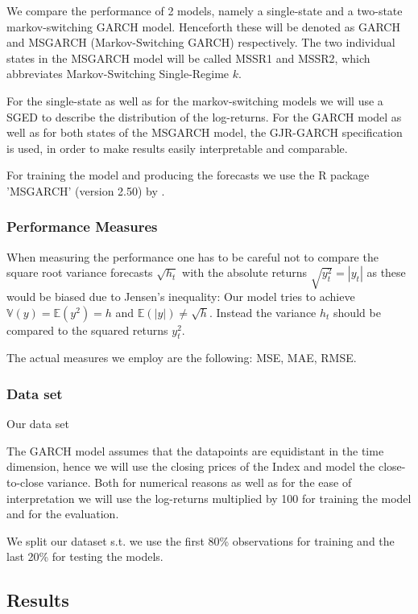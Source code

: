 \documentclass[11pt,a4paper]{article}
\begin{document}
We compare the performance of 2 models, namely a single-state and a two-state markov-switching GARCH model. Henceforth these will be denoted as GARCH and MSGARCH (Markov-Switching GARCH) respectively. The two individual states in the MSGARCH model will be called MSSR1 and MSSR2, which abbreviates Markov-Switching Single-Regime $k$.

For the single-state as well as for the markov-switching models we will use a \ac{SGED} to describe the distribution of the log-returns.
For the GARCH model as well as for both states of the MSGARCH model, the GJR-GARCH specification is used, in order to make results easily interpretable and comparable.

For training the model and producing the forecasts we use the R package 'MSGARCH' (version 2.50) by \cite{ardia_markov-switching_2019}.

\subsubsection{Performance Measures}
When measuring the performance one has to be careful not to compare the square root variance forecasts $\sqrt{h_t}$ with the absolute returns $\sqrt{y_t^2} = | y_t |$ as these would be biased due to Jensen's inequality: Our model tries to achieve $\mathbb{V}(y) =\mathbb{E}(y^2) = h$ and $\mathbb{E}(| y |) \neq \sqrt{h}$. Instead the variance $h_t$ should be compared to the squared returns $y_t^2$.

The actual measures we employ are the following: \ac{MSE}, \ac{MAE}, \ac{RMSE}.

\subsubsection{Data set}
Our data set 

The GARCH model assumes that the datapoints are equidistant in the time dimension, hence we will use the closing prices of the Index and model the close-to-close variance. Both for numerical reasons as well as for the ease of interpretation we will use the log-returns multiplied by 100 for training the model and for the evaluation.

We split our dataset s.t. we use the first 80\% observations for training and the last 20\% for testing the models.


\subsection{Results}
\end{document}
